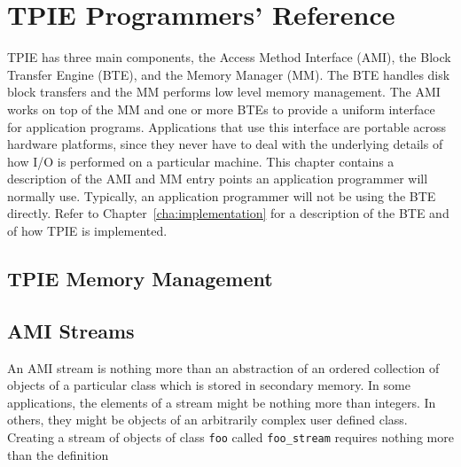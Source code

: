 \chapter{TPIE Programmers' Reference}



TPIE has three main components, the Access Method Interface (AMI), the
Block Transfer Engine (BTE), and the Memory Manager (MM). The BTE handles
disk block transfers and the MM performs low level memory management. The
AMI works on top of the MM and one or more BTEs to provide a uniform
interface for application programs. Applications that use this interface
are portable across hardware platforms, since they never have to deal with
the underlying details of how I/O is performed on a particular
machine. This chapter contains a description of the AMI and MM entry points
an application programmer will normally use. Typically, an application
programmer will not be using the BTE directly. Refer to
Chapter~\ref{cha:implementation} for a description of the BTE and of how
TPIE is implemented.


\section{TPIE Memory Management}
\label{sec:mm-ref}

\tobewritten




\section{AMI Streams}
\label{sec:ami_stream-ref}

\tobeextended

An AMI stream is
nothing more than an abstraction of an ordered collection of objects of a
particular class which is stored in secondary memory.  In some
applications, the elements of a stream might be nothing more than integers.
In others, they might be objects of an arbitrarily complex user defined
class.  Creating a stream of objects of class \verb|foo| called
\verb|foo_stream| requires nothing more than the definition

